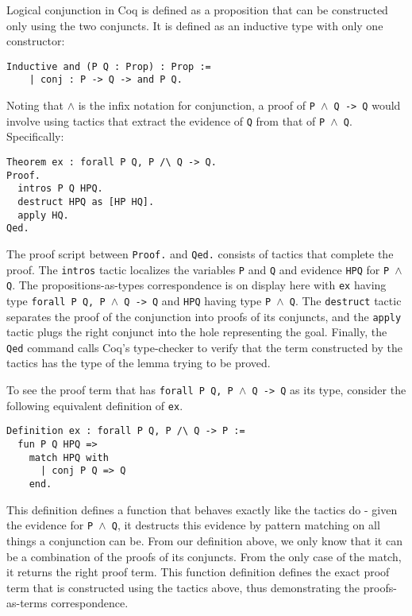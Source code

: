 \documentclass{article}
\begin{document}
	Logical conjunction in Coq is 
	defined as a proposition that 
	can be constructed only using 
	the two conjuncts. It is defined
	as an inductive type with 
	only one constructor:
	\begin{verbatim}
Inductive and (P Q : Prop) : Prop :=
	| conj : P -> Q -> and P Q.
	\end{verbatim}
	
	Noting that $\land$ is the infix 
	notation for conjunction, 
	a proof of \texttt{P $\land$ Q -> Q} 
	would involve using tactics that
	extract the evidence of \texttt{Q}
	from that of \texttt{P $\land$ Q}.
	Specifically:
	\begin{verbatim}
Theorem ex : forall P Q, P /\ Q -> Q.
Proof.
  intros P Q HPQ. 
  destruct HPQ as [HP HQ].
  apply HQ.
Qed.
	\end{verbatim}
	The proof script between 
	\texttt{Proof.} and \texttt{Qed.}
	consists of tactics that complete 
	the proof. The \texttt{intros}
	tactic localizes the variables 
	\texttt{P} and \texttt{Q} and 
	evidence \texttt{HPQ} for 
	\texttt{P $\land$ Q}. The 
	propositions-as-types correspondence
	is on display here with \texttt{ex}
	having type 
	\texttt{forall P Q, P $\land$ Q -> Q}
	and \texttt{HPQ} having type
	\texttt{P $\land$ Q}. The 
	\texttt{destruct} tactic separates 
	the proof of the conjunction into 
	proofs of its conjuncts, and the 
	\texttt{apply} tactic plugs the 
	right conjunct into the hole 
	representing the goal. Finally,
	the \texttt{Qed} command calls 
	Coq's type-checker to verify that 
	the term constructed by the 
	tactics has the type of the 
	lemma trying to be proved.
	
	To see the proof term that has 
	\texttt{forall P Q, P $\land$ Q -> Q}
	as its type, consider the following
	equivalent definition of \texttt{ex}.
	
\begin{verbatim}
Definition ex : forall P Q, P /\ Q -> P :=
  fun P Q HPQ => 
    match HPQ with
	  | conj P Q => Q
    end.
\end{verbatim}
	This definition defines a function that 
	behaves exactly like the tactics do - 
	given the evidence for \texttt{P $\land$ Q},
	it destructs this evidence by pattern
	matching on all things a conjunction can 
	be. From our definition above, we only 
	know that it can be a combination of 
	the proofs of its conjuncts. From the 
	only case of the match, it returns the 
	right proof term. This function 
	definition defines the exact proof term 
	that is constructed using the tactics 
	above, thus demonstrating the 
	proofs-as-terms correspondence.
\end{document}
